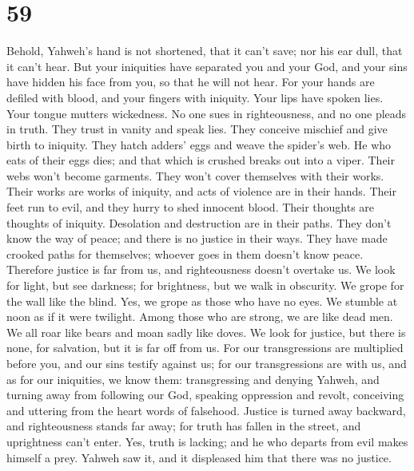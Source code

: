 \hypertarget{section-56}{%
\section{59}\label{section-56}}

 Behold, Yahweh's hand is not shortened, that it can't
save; nor his ear dull, that it can't hear.  But your
iniquities have separated you and your God, and your sins have hidden
his face from you, so that he will not hear.  For your
hands are defiled with blood, and your fingers with iniquity. Your lips
have spoken lies. Your tongue mutters wickedness.  No one
sues in righteousness, and no one pleads in truth. They trust in vanity
and speak lies. They conceive mischief and give birth to iniquity.
 They hatch adders' eggs and weave the spider's web. He
who eats of their eggs dies; and that which is crushed breaks out into a
viper.  Their webs won't become garments. They won't cover
themselves with their works. Their works are works of iniquity, and acts
of violence are in their hands.  Their feet run to evil,
and they hurry to shed innocent blood. Their thoughts are thoughts of
iniquity. Desolation and destruction are in their paths. 
They don't know the way of peace; and there is no justice in their ways.
They have made crooked paths for themselves; whoever goes in them
doesn't know peace.  Therefore justice is far from us, and
righteousness doesn't overtake us. We look for light, but see darkness;
for brightness, but we walk in obscurity.  We grope for
the wall like the blind. Yes, we grope as those who have no eyes. We
stumble at noon as if it were twilight. Among those who are strong, we
are like dead men.  We all roar like bears and moan sadly
like doves. We look for justice, but there is none, for salvation, but
it is far off from us.  For our transgressions are
multiplied before you, and our sins testify against us; for our
transgressions are with us, and as for our iniquities, we know them:
 transgressing and denying Yahweh, and turning away from
following our God, speaking oppression and revolt, conceiving and
uttering from the heart words of falsehood.  Justice is
turned away backward, and righteousness stands far away; for truth has
fallen in the street, and uprightness can't enter.  Yes,
truth is lacking; and he who departs from evil makes himself a prey.
Yahweh saw it, and it displeased him that there was no justice.

